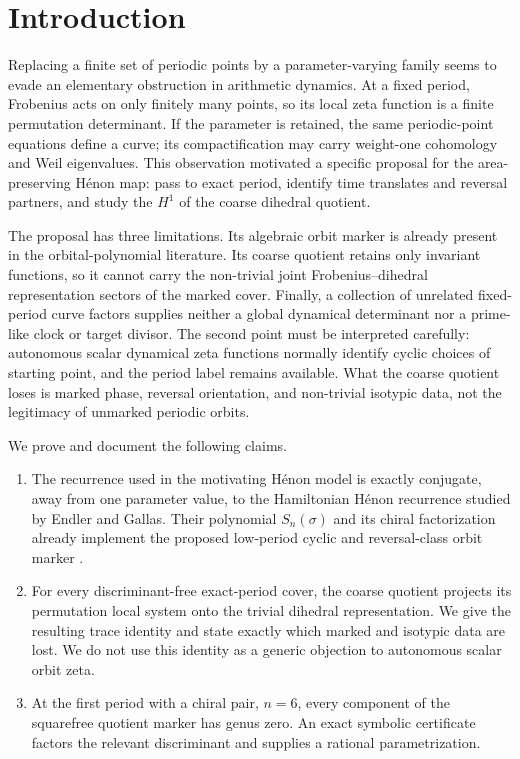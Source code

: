 \section{Introduction}

Replacing a finite set of periodic points by a parameter-varying family seems
to evade an elementary obstruction in arithmetic dynamics.  At a fixed
period, Frobenius acts on only finitely many points, so its local zeta function
is a finite permutation determinant.  If the parameter is retained, the same
periodic-point equations define a curve; its compactification may carry
weight-one cohomology and Weil eigenvalues.  This observation motivated a
specific proposal for the area-preserving H\'enon map: pass to exact period,
identify time translates and reversal partners, and study the $H^1$ of the
coarse dihedral quotient.

The proposal has three limitations.  Its algebraic orbit marker is already
present in the orbital-polynomial literature.  Its coarse quotient retains
only invariant functions, so it cannot carry the non-trivial joint
Frobenius--dihedral representation sectors of the marked cover.  Finally, a
collection of unrelated fixed-period curve factors supplies neither a global
dynamical determinant nor a prime-like clock or target divisor.  The second
point must be interpreted carefully: autonomous scalar dynamical zeta
functions normally identify cyclic choices of starting point, and the period
label remains available.  What the coarse quotient loses is marked phase,
reversal orientation, and non-trivial isotypic data, not the legitimacy of
unmarked periodic orbits.

We prove and document the following claims.

\begin{enumerate}
  \item The recurrence used in the motivating H\'enon model
  \citep{wang2026henon} is exactly conjugate, away from one parameter value,
  to the Hamiltonian H\'enon recurrence studied by Endler and Gallas.  Their
  polynomial $S_n(\sigma)$ and its chiral factorization already implement the
  proposed low-period cyclic and reversal-class orbit marker
  \citep{endler2002,endler2004,endler2006chiral,gallas2007}.
  \item For every discriminant-free exact-period cover, the coarse quotient
  projects its permutation local system onto the trivial dihedral
  representation.  We give the resulting trace identity and state exactly
  which marked and isotypic data are lost.  We do not use this identity as a
  generic objection to autonomous scalar orbit zeta.
  \item At the first period with a chiral pair, $n=6$, every component of the
  squarefree quotient marker has genus zero.  An exact symbolic certificate
  factors the relevant discriminant and supplies a rational parametrization.
\end{enumerate}

